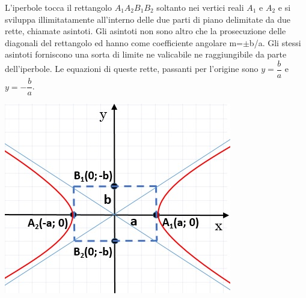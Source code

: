 \begin{description}
  \begin{minipage}[c]{.65\textwidth}
    L'iperbole tocca il rettangolo $A_{1} A_{2} B_{1} B_{2}$ 
soltanto nei vertici reali $A_{1}$ e $A_{2}$ e si sviluppa 
illimitatamente all'interno delle due parti di piano delimitate da due 
rette, chiamate asintoti. Gli asintoti non sono altro che la prosecuzione 
delle diagonali del rettangolo ed hanno come coefficiente angolare m=$ \pm 
$b/a. Gli stessi asintoti forniscono una sorta di limite ne valicabile ne 
raggiungibile da parte dell'iperbole. Le equazioni di queste rette, 
passanti per l'origine sono $y = \dfrac{b}{a} $ e $y =- \dfrac{b}{a}$.
  \end{minipage}
  \hspace{.2cm}
  \begin{minipage}[c]{.3\textwidth}
    \includegraphics[width=\textwidth]{img/asintoti.jpg}
  \end{minipage}


\end{description}
